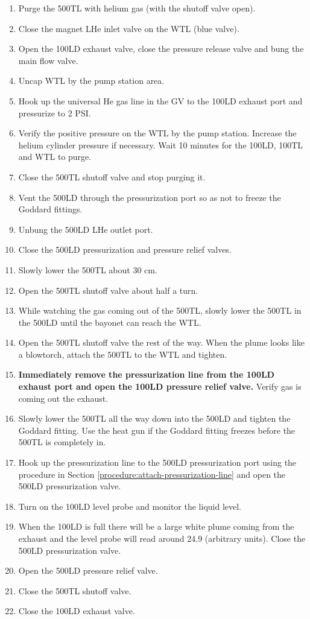\begin{enumerate}
 \item Purge the 500TL with helium gas (with the shutoff valve open).
 \item Close the magnet LHe inlet valve on the WTL (blue valve).
 \item Open the 100LD exhaust valve, close the pressure release valve and bung the main flow valve.
 \item Uncap WTL by the pump station area.
 \item Hook up the universal He gas line in the GV to the 100LD exhaust port and pressurize to 2 PSI.
 \item Verify the positive pressure on the WTL by the pump station.  Increase the helium cylinder pressure if necessary.  Wait 10 minutes for the 100LD, 100TL and WTL to purge.
 \item Close the 500TL shutoff valve and stop purging it.
 \item Vent the 500LD through the pressurization port so as not to freeze the Goddard fittings.
 \item Unbung the 500LD LHe outlet port.
 \item Close the 500LD pressurization and pressure relief valves.
 \item Slowly lower the 500TL about 30 cm.
 \item Open the 500TL shutoff valve about half a turn.
 \item While watching the gas coming out of the 500TL, slowly lower the 500TL in the 500LD until the bayonet can reach the WTL.
 \item Open the 500TL shutoff valve the rest of the way.  When the plume looks like a blowtorch, attach the 500TL to the WTL and tighten.
 \item \textbf{Immediately remove the pressurization line from the 100LD exhaust port and open the 100LD pressure relief valve.} Verify gas is coming out the exhaust.
 \item Slowly lower the 500TL all the way down into the 500LD and tighten the Goddard fitting.  Use the heat gun if the Goddard fitting freezes before the 500TL is completely in.
 \item Hook up the pressurization line to the 500LD pressurization port using the procedure in Section \ref{procedure:attach-pressurization-line} and open the 500LD pressurization valve.
 \item Turn on the 100LD level probe and monitor the liquid level.
 \item When the 100LD is full there will be a large white plume coming from the exhaust and the level probe will read around 24.9 (arbitrary units). Close the 500LD pressurization valve.
 \item Open the 500LD pressure relief valve.
 \item Close the 500TL shutoff valve.
 \item Close the 100LD exhaust valve.
\end{enumerate}

